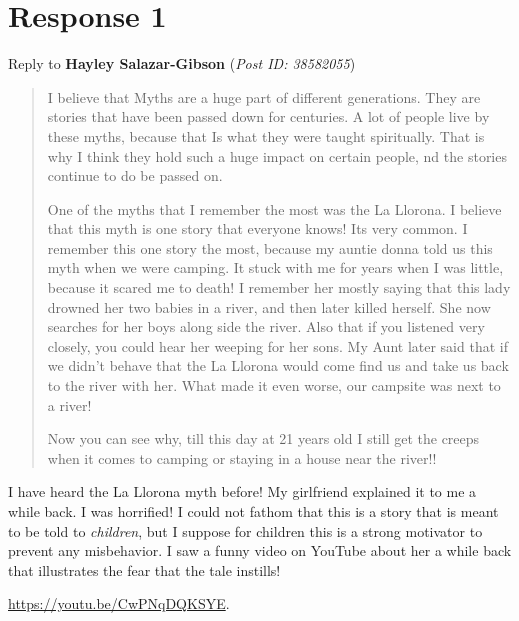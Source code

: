 \documentclass[12pt]{article}
\theoremstyle{definition}
\theoremstyle{plain}
\begin{document}
    \section{Response 1}
      \begin{mdframed}
        Reply to \textbf{Hayley Salazar-Gibson} (\textit{Post ID: 38582055})
      \end{mdframed}
      \begin{quote}
          I believe that Myths are a huge part of different generations.
            They are stories that have been passed down for centuries. A
            lot of people live by these myths, because that Is what they were
            taught spiritually. That is why I think they hold such a huge
            impact on certain people, nd the stories continue to do be passed
            on.
            
          One of the myths that I remember the most was the La Llorona.
            I believe that this myth is one story that everyone knows! Its very
            common. I remember this one story the most, because my auntie donna
            told us this myth when we were camping. It stuck with me for years
            when I was little, because it scared me to death! I remember her
            mostly saying that this lady drowned her two babies in a river, and
            then later killed herself. She now searches for her boys along side
            the river. Also that if you listened very closely, you could hear
            her weeping for her sons. My Aunt later said that if we didn't
            behave that the La Llorona would come find us and take us back to
            the river with her. What made it even worse, our campsite was next to
            a river!

          Now you can see why, till this day at 21 years old I still get the
            creeps when it comes to camping or staying in a house near the
            river!! 
      \end{quote}
      I have heard the La Llorona myth before! My girlfriend explained it to me
        a while back. I was horrified! I could not fathom that this is a story
        that is meant to be told to \textit{children}, but I suppose for children
        this is a strong motivator to prevent any misbehavior. I saw a funny
        video on YouTube about her a while back that illustrates the fear that
        the tale instills!

      \href{Link to YouTube video}{https://youtu.be/CwPNqDQKSYE}.
      
\end{document}
